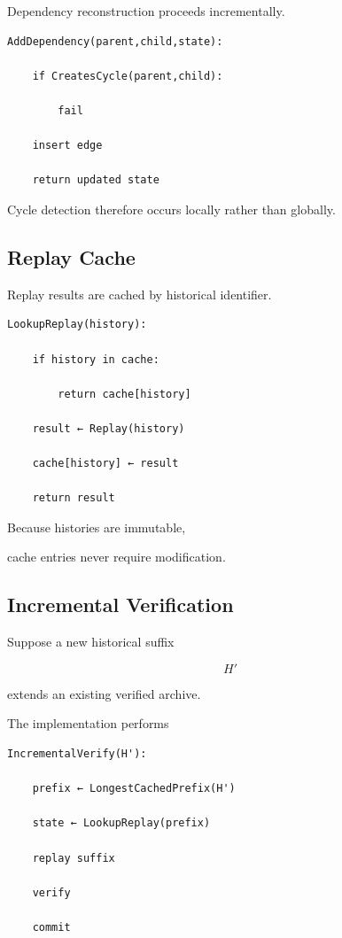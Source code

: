 \documentclass[12pt,oneside]{article}
\theoremstyle{definition}
\theoremstyle{remark}
\begin{document}
Dependency reconstruction proceeds incrementally.

\begin{verbatim}
AddDependency(parent,child,state):

    if CreatesCycle(parent,child):

        fail

    insert edge

    return updated state
\end{verbatim}

Cycle detection therefore occurs locally rather than globally.


\subsection{Replay Cache}

Replay results are cached by historical identifier.

\begin{verbatim}
LookupReplay(history):

    if history in cache:

        return cache[history]

    result ← Replay(history)

    cache[history] ← result

    return result
\end{verbatim}

Because histories are immutable,

cache entries never require modification.


\subsection{Incremental Verification}

Suppose a new historical suffix

\[
H'
\]

extends an existing verified archive.

The implementation performs

\begin{verbatim}
IncrementalVerify(H'):

    prefix ← LongestCachedPrefix(H')

    state ← LookupReplay(prefix)

    replay suffix

    verify

    commit
\end{verbatim}
\end{document}
